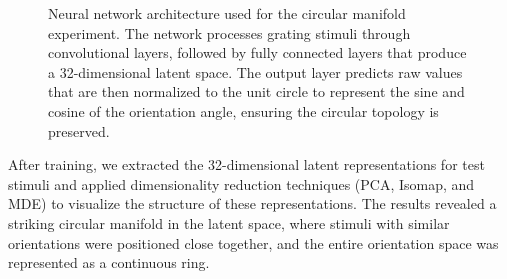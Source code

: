 \documentclass[11pt,a4paper]{article}
\begin{document}
\begin{figure}
\begin{tikzpicture}
    \end{tikzpicture}
    \caption{Neural network architecture used for the circular manifold experiment. The network processes grating stimuli through convolutional layers, followed by fully connected layers that produce a 32-dimensional latent space. The output layer predicts raw values that are then normalized to the unit circle to represent the sine and cosine of the orientation angle, ensuring the circular topology is preserved.}
\end{figure}

After training, we extracted the 32-dimensional latent representations for test stimuli and applied dimensionality reduction techniques (PCA, Isomap, and MDE) to visualize the structure of these representations. The results revealed a striking circular manifold in the latent space, where stimuli with similar orientations were positioned close together, and the entire orientation space was represented as a continuous ring.
\end{document}
